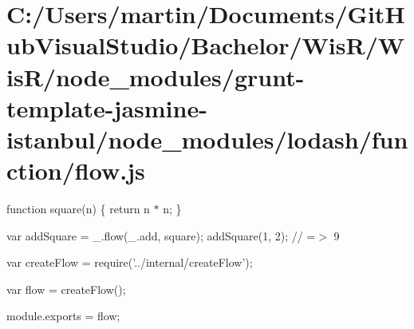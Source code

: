 \hypertarget{_c_1_2_users_2martin_2_documents_2_git_hub_visual_studio_2_bachelor_2_wis_r_2_wis_r_2node_module82dbf9ab076dab94deb72ec070a479b2}{}\section{C\+:/\+Users/martin/\+Documents/\+Git\+Hub\+Visual\+Studio/\+Bachelor/\+Wis\+R/\+Wis\+R/node\+\_\+modules/grunt-\/template-\/jasmine-\/istanbul/node\+\_\+modules/lodash/function/flow.\+js}
function square(n) \{ return n $\ast$ n; \}

var add\+Square = \+\_\+.\+flow(\+\_\+.\+add, square); add\+Square(1, 2); // =$>$ 9


\begin{DoxyCodeInclude}
var createFlow = require(\textcolor{stringliteral}{'../internal/createFlow'});

var flow = createFlow();

module.exports = flow;
\end{DoxyCodeInclude}
 